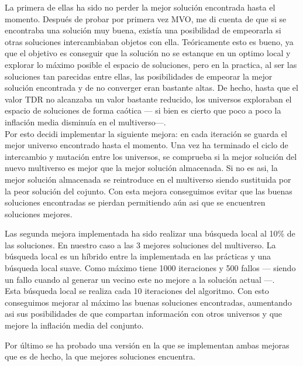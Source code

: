 La primera de ellas ha sido no perder la mejor solución encontrada hasta el momento. Después de probar por primera vez MVO, me di cuenta de que si se encontraba una solución muy buena, existía una posibilidad de empeorarla si otras soluciones intercambiaban objetos con ella. Teóricamente esto es bueno, ya que el objetivo es conseguir que la solución no se estanque en un optimo local y explorar lo máximo posible el espacio de soluciones, pero en la practica, al ser las soluciones tan parecidas entre ellas, las posibilidades de empeorar la mejor solución encontrada y de no converger eran bastante altas. De hecho, hasta que el valor TDR no alcanzaba un valor bastante reducido, los universos exploraban el espacio de soluciones de forma caótica --- si bien es cierto que poco a poco la inflación media disminuía en el multiverso---.\\
Por esto decidi implementar la siguiente mejora: en cada iteración se guarda el mejor universo encontrado hasta el momento. Una vez ha terminado el ciclo de intercambio y mutación entre los universos, se comprueba si la mejor solución del nuevo multiverso es mejor que la mejor solución almacenada. Si no es asi, la mejor solución almacenada se reintroduce en el multiverso siendo sustituida por la peor solución del cojunto. Con esta mejora conseguimos evitar que las buenas soluciones encontradas se pierdan permitiendo aún asi que se encuentren soluciones mejores.

Las segunda mejora implementada ha sido realizar una búsqueda local al 10\% de las soluciones. En nuestro caso a las 3 mejores soluciones del multiverso. La búsqueda local es un híbrido entre la implementada en las prácticas y una búsqueda local suave. Como máximo tiene 1000 iteraciones y 500 fallos --- siendo un fallo cuando al generar un vecino este no mejore a la solución actual ---. \\ Esta búsqueda local se realiza cada 10 iteraciones del algoritmo. Con esto conseguimos mejorar al máximo las buenas soluciones encontradas, aumentando asi sus posibilidades de que compartan información con otros universos y que mejore la inflación media del conjunto.

Por último se ha probado una versión en la que se implementan ambas mejoras que es de hecho, la que mejores soluciones encuentra.
\newpage
